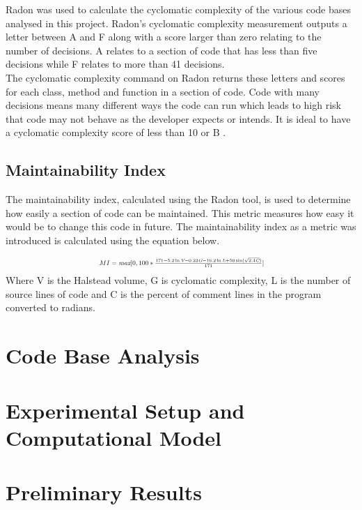 \documentclass[11pt,journal, a4paper]{IEEEtran}
\begin{document}
\noindent
Radon was used to calculate the cyclomatic complexity of the various code bases analysed in this project. Radon's cyclomatic complexity measurement outputs a letter between A and F along with a score larger than zero relating to the number of decisions. A relates to a section of code that has less than five decisions while F relates to more than 41 decisions. \\

\noindent
The cyclomatic complexity command on Radon returns these letters and scores for each class, method and function in a section of code. Code with many decisions means many different ways the code can run which leads to high risk that code may not behave as the developer expects or intends. It is ideal to have a cyclomatic complexity score of less than 10 or B \cite{mcCabe}.  


\subsection{Maintainability Index}
\noindent
The maintainability index, calculated using the Radon tool, is used to determine how easily a section of code can be maintained. This metric measures how easy it would be to change this code in future. The maintainability index as a metric was introduced is calculated using the equation below. 


\begin{equation}
\resizebox{0.5\textwidth}{!}{ $MI = \emph{max} [0,100*\frac{171-5.2\ln\emph{V}-0.23\emph{G} -16.2\ln\emph{L} + 50\sin(\sqrt{2.4\emph{C}}) }{171}]$}
\end{equation}
Where V is the Halstead volume, G is cyclomatic complexity, L is the number of source lines of code and C is the percent of comment lines in the program converted to radians.


\section{Code Base Analysis}
\noindent

\section{Experimental Setup and Computational Model}
\noindent


\section{Preliminary Results}
\noindent
\end{document}
